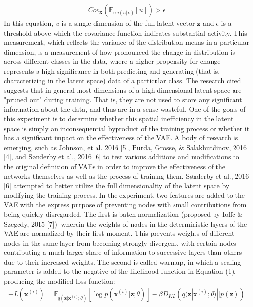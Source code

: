\documentclass{article} %
\begin{document}
\begin{align}
  Cov_{\textbf{x}}\left(\mathbb{E}_{u~q(u|\textbf{x})}[u]\right)>\epsilon
\end{align}
In this equation, $u$ is a single dimension of the full latent vector $\textbf{z}$ and $\epsilon$ is a threshold above which the covariance function indicates substantial activity. This measurement, which reflects the variance of the distribution means in a particular dimension, is a measurement of how pronounced the change in distribution is across different classes in the data, where a higher propensity for change represents a high significance in both predicting and generating (that is, characterizing in the latent space) data of a particular class. The research cited suggests that in general most dimensions of a high dimensional latent space are "pruned out" during training. That is, they are not used to store any significant information about the data, and thus are in a sense wasteful. One of the goals of this experiment is to determine whether this spatial inefficiency in the latent space is simply an inconsequential byproduct of the training process or whether it has a significant impact on the effectiveness of the VAE.
A body of research is emerging, such as Johnson, et al. 2016 [5], Burda, Grosse, \& Salakhutdinov, 2016 [4], and Sønderby et al., 2016 [6] to test various additions and modifications to the original definition of VAEs in order to improve the effectiveness of the networks themselves as well as the process of training them. Sønderby et al., 2016 [6] attempted to better utilize the full dimensionality of the latent space by modifying the training process. In the experiment, two features are added to the VAE with the express purpose of preventing nodes with small contributions from being quickly disregarded. The first is batch normalization (proposed by Ioffe \& Szegedy, 2015 [7]), wherein the weights of nodes in the deterministic layers of the VAE are normalized by their first moment. This prevents weights of different nodes in the same layer from becoming strongly divergent, with certain nodes contributing a much larger share of information to successive layers than others due to their increased weights. The second is called warmup, in which a scaling parameter is added to the negative of the likelihood function in Equation (1), producing the modified loss function:
\begin{align}
  -L(\textbf{x}^{(i)})=\mathbb{E}_{q(\textbf{z}|\textbf{x}^{(i)};\theta)}\left[\log{p(\textbf{x}^{(i)}|\textbf{z};\theta)}\right]-\beta D_{KL}\left(q(\textbf{z}|\textbf{x}^{(i)};\theta)||p(\textbf{z})\right)
\end{align}
\end{document}
